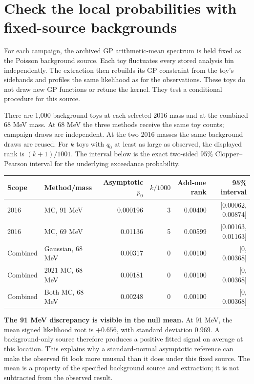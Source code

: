 \documentclass[11pt]{article}
\begin{document}
\clearpage\section*{Check the local probabilities with fixed-source backgrounds}

For each campaign, the archived GP arithmetic-mean spectrum is held fixed as the Poisson background source. Each toy fluctuates every stored analysis bin independently. The extraction then rebuilds its GP constraint from the toy's sidebands and profiles the same likelihood as for the observations. These toys do not draw new GP functions or retune the kernel. They test a conditional procedure for this source.

There are 1,000 background toys at each selected 2016 mass and at the combined 68 MeV mass. At 68 MeV the three methods receive the same toy counts; campaign draws are independent. At the two 2016 masses the same background draws are reused. For $k$ toys with $q_0$ at least as large as observed, the displayed rank is $(k+1)/1001$. The interval below is the exact two-sided 95\% Clopper--Pearson interval for the underlying exceedance probability.

\begin{center}\small\begin{tabular}{llrrrr}\toprule
Scope & Method/mass & Asymptotic $p_0$ & $k/1000$ & Add-one rank & 95\% interval\\\midrule
2016 & MC, 91 MeV & 0.000196 & 3 & 0.00400 & [0.00062, 0.00874]\\
2016 & MC, 69 MeV & 0.01136 & 5 & 0.00599 & [0.00163, 0.01163]\\
Combined & Gaussian, 68 MeV & 0.00317 & 0 & 0.00100 & [0, 0.00368]\\
Combined & 2021 MC, 68 MeV & 0.00181 & 0 & 0.00100 & [0, 0.00368]\\
Combined & Both MC, 68 MeV & 0.00248 & 0 & 0.00100 & [0, 0.00368]\\\bottomrule
\end{tabular}\end{center}

\textbf{The 91 MeV discrepancy is visible in the null mean.} At 91 MeV, the mean signed likelihood root is $+0.656$, with standard deviation 0.969. A background-only source therefore produces a positive fitted signal on average at this location. This explains why a standard-normal asymptotic reference can make the observed fit look more unusual than it does under this fixed source. The mean is a property of the specified background source and extraction; it is not subtracted from the observed result.
\end{document}
